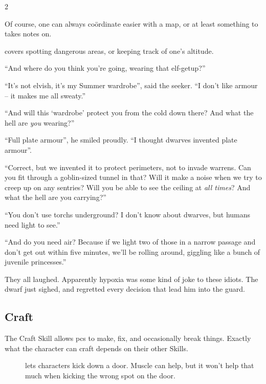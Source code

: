 \begin{multicols}{2}
\begin{description}
    Of course, one can always co\"ordinate easier with a map, or at least something to takes notes on.
  \item[\roll{Wits}{Caving}]
    covers spotting dangerous areas, or keeping track of one's altitude.
\end{description}

\begin{exampletext}

  ``And where do you think you're going, wearing that elf-getup?''

  ``It's not elvish, it's my Summer wardrobe'', said the \gls{seeker}.
  ``I don't like armour -- it makes me all sweaty.''

  ``And will this `wardrobe' protect you from the cold down there?
  And what the hell are \emph{you} wearing?''

  ``Full plate armour'', he smiled proudly.
  ``I thought dwarves invented plate armour''.

  ``Correct, but we invented it to protect perimeters, not to invade warrens.
  Can you fit through a goblin-sized tunnel in that?
  Will it make a noise when we try to creep up on any sentries?
  Will you be able to see the ceiling at \emph{all times}?
  And what the hell are you carrying?''

  ``You don't use \glspl{torch} underground?
  I don't know about dwarves, but humans need light to see.''

  ``And do you need air?
  Because if we light two of those in a narrow passage and don't get out within five minutes, we'll be rolling around, giggling like a bunch of juvenile princesses.''

  They all laughed.
  Apparently hypoxia was some kind of joke to these idiots.
  The dwarf just sighed, and regretted every decision that lead him into the \gls{guard}.
  
\end{exampletext}

\subsection{Craft}

The Craft Skill allows \glspl{pc} to make, fix, and occasionally break things.
Exactly what the character can craft depends on their other Skills.

\craftingReqList

\begin{description}
  \item[]
    lets characters kick down a door.
    Muscle can help, but it won't help that much when kicking the wrong spot on the door.


\end{description}
\end{multicols}
